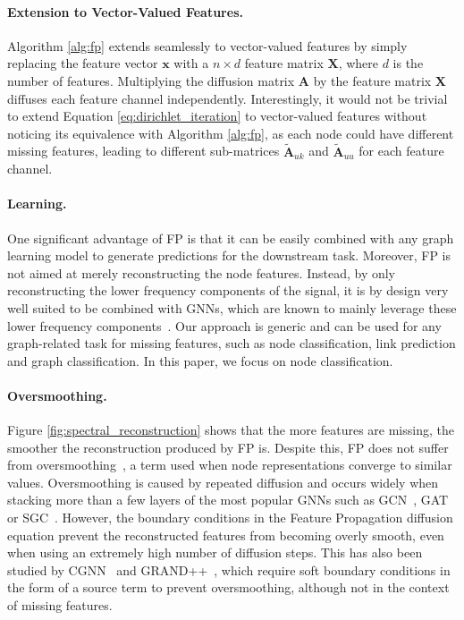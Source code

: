 \paragraph{Extension to Vector-Valued Features.}
Algorithm \ref{alg:fp} extends seamlessly to vector-valued features by simply replacing the feature vector $\mathbf{x}$ with a $n \times d$ feature matrix $\mathbf{X}$, where $d$ is the number of features. Multiplying the diffusion matrix $\mathbf{A}$ by the feature matrix $\mathbf{X}$ diffuses each feature channel independently. Interestingly, it would not be trivial to extend Equation \ref{eq:dirichlet_iteration} to vector-valued features without noticing its equivalence with Algorithm \ref{alg:fp}, as each node could have different missing features, leading to different sub-matrices $\tilde{\mathbf{A}}_{uk}$ and $\tilde{\mathbf{A}}_{uu}$ for each feature channel.

\paragraph{Learning.}
One significant advantage of FP is that it can be easily combined with any graph learning model to generate predictions for the downstream task. Moreover, FP is not aimed at merely reconstructing the node features. Instead, by only reconstructing the lower frequency components of the signal, it is by design very well suited to be combined with GNNs, which are known to mainly leverage these lower frequency components~\citep{pmlr-v97-wu19e}.
Our approach is generic and can be used for any graph-related task for missing features, such as node classification, link prediction and graph classification. In this paper, we focus on node classification.

\paragraph{Oversmoothing.}
Figure \ref{fig:spectral_reconstruction} shows that the more features are missing, the smoother the reconstruction produced by FP is. Despite this, FP does not suffer from oversmoothing~\citep{oono2020graph}, a term used when node representations converge to similar values. Oversmoothing is caused by repeated diffusion and occurs widely when stacking more than a few layers of the most popular GNNs such as GCN~\citep{Kipf:2016tc}, GAT~\citep{velickovic2018graph} or SGC~\citep{pmlr-v97-wu19e}. However, the boundary conditions in the Feature Propagation diffusion equation prevent the reconstructed features from becoming overly smooth, even when using an extremely high number of diffusion steps. This has also been studied by CGNN~\citep{10.5555/3524938.3525904} and GRAND++~\citep{thorpe2022grand}, which require soft boundary conditions in the form of a source term to prevent oversmoothing, although not in the context of missing features. 



